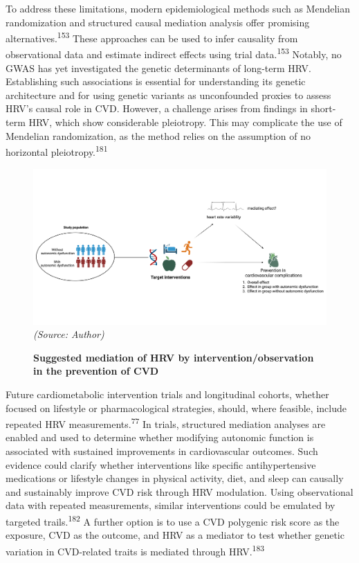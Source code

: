 \documentclass[
  a4paper,
  headsepline=true,
  open=left]{scrbook}
\begin{document}
To address these limitations, modern epidemiological methods such as
Mendelian randomization and structured causal mediation analysis offer
promising alternatives.\textsuperscript{153} These approaches can be
used to infer causality from observational data and estimate indirect
effects using trial data.\textsuperscript{153} Notably, no GWAS has yet
investigated the genetic determinants of long-term HRV. Establishing
such associations is essential for understanding its genetic
architecture and for using genetic variants as unconfounded proxies to
assess HRV's causal role in CVD. However, a challenge arises from
findings in short-term HRV, which show considerable pleiotropy. This may
complicate the use of Mendelian randomization, as the method relies on
the assumption of no horizontal pleiotropy.\textsuperscript{181}

\begin{figure}

{\centering 

\includegraphics{images/Mediation_HRV_1.png} \emph{(Source: Author)}

}

\caption{\label{fig-mediation}\textbf{Suggested mediation of HRV by
intervention/observation in the prevention of CVD}}

\end{figure}

Future cardiometabolic intervention trials and longitudinal cohorts,
whether focused on lifestyle or pharmacological strategies, should,
where feasible, include repeated HRV measurements.\textsuperscript{77}
In trials, structured mediation analyses are enabled and used to
determine whether modifying autonomic function is associated with
sustained improvements in cardiovascular outcomes. Such evidence could
clarify whether interventions like specific antihypertensive medications
or lifestyle changes in physical activity, diet, and sleep can causally
and sustainably improve CVD risk through HRV modulation. Using
observational data with repeated measurements, similar interventions
could be emulated by targeted trails.\textsuperscript{182} A further
option is to use a CVD polygenic risk score as the exposure, CVD as the
outcome, and HRV as a mediator to test whether genetic variation in
CVD-related traits is mediated through HRV.\textsuperscript{183}
\end{document}
